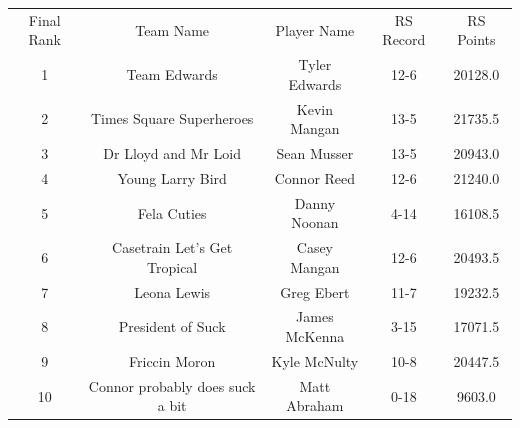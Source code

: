 \documentclass[11pt,letterpaper]{article}
\begin{document}
\newpage
{}
\vspace{-25pt}
\begin{table} [h]
\begin{center}
\begin{tabular} { c c c c c }
\\ Final Rank & Team Name & Player Name & RS Record & RS Points
\\ 1 & Team Edwards & Tyler Edwards & 12-6 & 20128.0
\\ 2 & Times Square Superheroes & Kevin Mangan & 13-5 & 21735.5
\\ 3 & Dr Lloyd and Mr Loid & Sean Musser & 13-5 & 20943.0
\\ 4 & Young Larry Bird & Connor Reed & 12-6 & 21240.0
\\ 5 & Fela Cuties & Danny Noonan & 4-14 & 16108.5
\\ 6 & Casetrain Let's Get Tropical & Casey Mangan & 12-6 & 20493.5
\\ 7 & Leona Lewis & Greg Ebert & 11-7 & 19232.5
\\ 8 & President of Suck & James McKenna & 3-15 & 17071.5
\\ 9 & Friccin Moron & Kyle McNulty & 10-8 & 20447.5
\\ 10 & Connor probably does suck a bit & Matt Abraham & 0-18 & 9603.0
\end{tabular}
\end{center}
\end{table}
\end{document}
